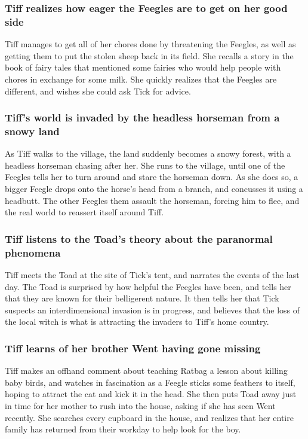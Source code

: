 \subsubsection{\Gls{Tiff} realizes how eager the Feegles are to get on her good side}
\Gls{Tiff} manages to get all of her chores done by threatening the Feegles, as well as getting them
to put the stolen sheep back in its field. She recalls a story in the book of fairy tales that
mentioned some fairies who would help people with chores in exchange for some milk. She quickly
realizes that the Feegles are different, and wishes she could ask \Gls{Tick} for advice.

\subsubsection{\Gls{Tiff}'s world is invaded by the headless horseman from a snowy land}
As \Gls{Tiff} walks to the village, the land suddenly becomes a snowy forest, with a headless
horseman chasing after her. She runs to the village, until one of the Feegles tells her to turn
around and stare the horseman down. As she does so, a bigger Feegle drops onto the horse's head from
a branch, and concusses it using a headbutt. The other Feegles them assault the horseman, forcing
him to flee, and the real world to reassert itself around \Gls{Tiff}.

\subsubsection{\Gls{Tiff} listens to the \Gls{Toad}'s theory about the paranormal phenomena}
\Gls{Tiff} meets the \Gls{Toad} at the site of \Gls{Tick}'s tent, and narrates the events of the
last day. The \Gls{Toad} is surprised by how helpful the Feegles have been, and tells her that they
are known for their belligerent nature. It then tells her that \Gls{Tick} suspects an
interdimensional invasion is in progress, and believes that the loss of the local witch is what is
attracting the invaders to \Gls{Tiff}'s home country.

\subsubsection{\Gls{Tiff} learns of her brother \Gls{Went} having gone missing}
\Gls{Tiff} makes an offhand comment about teaching \Gls{Ratbag} a lesson about killing baby birds,
and watches in fascination as a Feegle sticks some feathers to itself, hoping to attract the cat
and kick it in the head. She then puts \Gls{Toad} away just in time for her mother to rush into the
house, asking if she has seen \Gls{Went} recently. She searches every cupboard in the house, and
realizes that her entire family has returned from their workday to help look for the boy.

